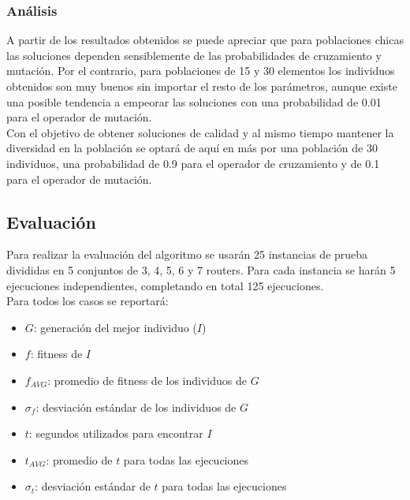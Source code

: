 \documentclass[journal]{IEEEtran}
\begin{document}

\subsubsection*{Análisis}

A partir de los resultados obtenidos se puede apreciar que para poblaciones chicas las soluciones dependen sensiblemente de las probabilidades de cruzamiento y mutación. Por el contrario, para poblaciones de 15 y 30 elementos los individuos obtenidos son muy buenos sin importar el resto de los parámetros, aunque existe una posible tendencia a empeorar las soluciones con una probabilidad de 0.01 para el operador de mutación.\\

Con el objetivo de obtener soluciones de calidad y al mismo tiempo mantener la diversidad en la población se optará de aquí en más por una población de 30 individuos, una probabilidad de 0.9 para el operador de cruzamiento y de 0.1 para el operador de mutación.

\subsection{Evaluación}

Para realizar la evaluación del algoritmo se usarán 25 instancias de prueba divididas en 5 conjuntos de 3, 4, 5, 6 y 7 routers. Para cada instancia se harán 5 ejecuciones independientes, completando en total 125 ejecuciones.\\

Para todos los casos se reportará:\\

\begin{itemize}
\item $G$: generación del mejor individuo ($I$)
\item $f$: fitness de $I$
\item $f_{AVG}$: promedio de fitness de los individuos de $G$
\item $\sigma_f$: desviación estándar de los individuos de $G$
\item $t$: segundos utilizados para encontrar $I$
\item $t_{AVG}$: promedio de $t$ para todas las ejecuciones
\item $\sigma_t$: desviación estándar de $t$ para todas las ejecuciones
\end{itemize}
\end{document}
